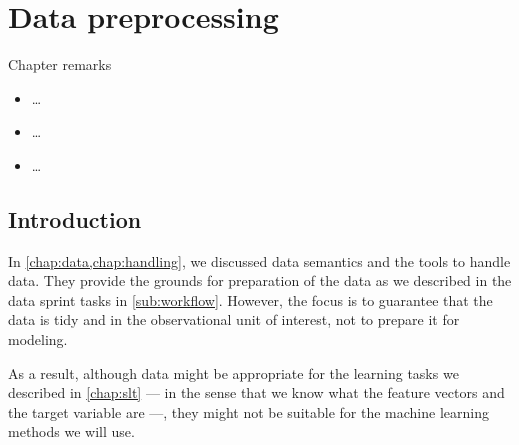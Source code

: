 \chapter{Data preprocessing}
\label{chap:preprocess}
\glsresetall


\begin{mainbox}{Chapter remarks}


  \startcontents[chapters]
  \vspace{1em}


  \begin{itemize}
    \itemsep0em
    \item \dots
  \end{itemize}


  \begin{itemize}
    \itemsep0em
    \item \dots
  \end{itemize}


  \begin{itemize}
    \itemsep0em
    \item \dots
  \end{itemize}
\end{mainbox}

{}
\clearpage

\section{Introduction}

In \cref{chap:data,chap:handling}, we discussed data semantics and the tools to
handle data.  They provide the grounds for preparation of the data as we described in the
data sprint tasks in \cref{sub:workflow}.  However, the focus is to guarantee that the
data is tidy and in the observational unit of interest, not to prepare it for modeling.

As a result, although data might be appropriate for the learning tasks we described in
\cref{chap:slt} --- in the sense that we know what the feature vectors and the target
variable are ---, they might not be suitable for the machine learning methods we will use.


